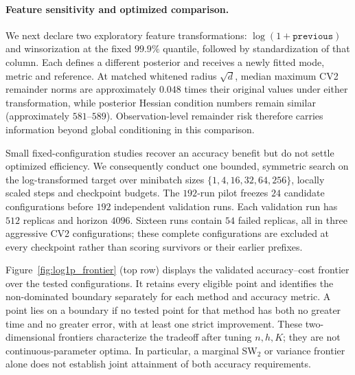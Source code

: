 \paragraph{Feature sensitivity and optimized comparison.}
We next declare two exploratory feature transformations: $\log(1+\texttt{previous})$ and winsorization at the fixed $99.9\%$ quantile, followed by standardization of that column. Each defines a different posterior and receives a newly fitted mode, metric and reference. At matched whitened radius $\sqrt d$, median maximum CV2 remainder norms are approximately $0.048$ times their original values under either transformation, while posterior Hessian condition numbers remain similar (approximately $581$--$589$). Observation-level remainder risk therefore carries information beyond global conditioning in this comparison.

Small fixed-configuration studies recover an accuracy benefit but do not settle optimized efficiency. We consequently conduct one bounded, symmetric search on the log-transformed target over minibatch sizes $\{1,4,16,32,64,256\}$, locally scaled steps and checkpoint budgets. The $192$-run pilot freezes $24$ candidate configurations before $192$ independent validation runs. Each validation run has $512$ replicas and horizon $4096$. Sixteen runs contain $54$ failed replicas, all in three aggressive CV2 configurations; these complete configurations are excluded at every checkpoint rather than scoring survivors or their earlier prefixes.

Figure~\ref{fig:log1p_frontier} (top row) displays the validated accuracy--cost frontier over the tested configurations. It retains every eligible point and identifies the non-dominated boundary separately for each method and accuracy metric. A point lies on a boundary if no tested point for that method has both no greater time and no greater error, with at least one strict improvement. These two-dimensional frontiers characterize the tradeoff after tuning $n,h,K$; they are not continuous-parameter optima. In particular, a marginal SW$_2$ or variance frontier alone does not establish joint attainment of both accuracy requirements.

